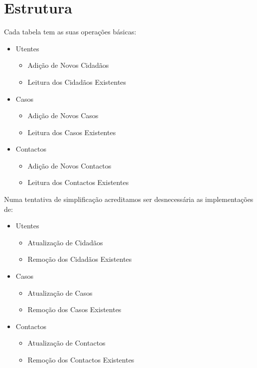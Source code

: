 \section{Estrutura}

Cada tabela tem as suas operações básicas:
\begin{itemize}
    \item Utentes
    \begin{itemize}
        \item Adição de Novos Cidadãos
        \item Leitura dos Cidadãos Existentes
    \end{itemize}
    
    \item Casos
    \begin{itemize}
        \item Adição de Novos Casos
        \item Leitura dos Casos Existentes
    \end{itemize}
    
    \item Contactos
    \begin{itemize}
        \item Adição de Novos Contactos
        \item Leitura dos Contactos Existentes
    \end{itemize}
\end{itemize}

\vfill

Numa tentativa de simplificação acreditamos ser desnecessária as implementações de:
\begin{itemize}
    \item Utentes
    \begin{itemize}
        \item Atualização de Cidadãos
        \item Remoção dos Cidadãos Existentes
    \end{itemize}
    
    \item Casos
    \begin{itemize}
        \item Atualização de Casos
        \item Remoção dos Casos Existentes
    \end{itemize}
    
    \item Contactos
    \begin{itemize}
        \item Atualização de Contactos
        \item Remoção dos Contactos Existentes
    \end{itemize}
\end{itemize}